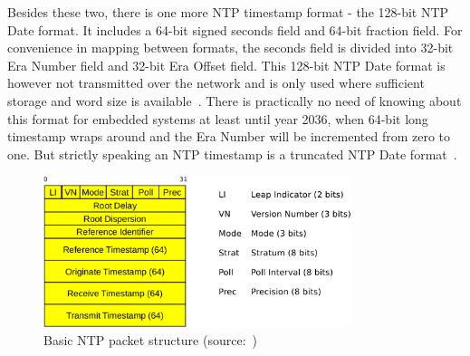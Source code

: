 Besides these two, there is one more NTP timestamp format - the 128-bit NTP Date format.
It includes a 64-bit signed seconds field and 64-bit fraction field.
For convenience in mapping between formats,
the seconds field is divided into 32-bit Era Number field
and 32-bit Era Offset field.
This 128-bit NTP Date format is however not transmitted over the network
and is only used where sufficient storage and word size is available~\cite{rfc5905}.
There is practically no need of knowing about this format for embedded systems
at least until year 2036, when 64-bit long timestamp wraps around and
the Era Number will be incremented from zero to one.
But strictly speaking an NTP timestamp is a truncated NTP Date format~\cite{rfc5905}.

\begin{figure}
	\centering
	\includegraphics[width=9cm,keepaspectratio]{fig/ntp-packet.pdf}
	\caption{Basic NTP packet structure (source:~\cite{ntp-arch})}
	\label{fig:ntp-packet}
	\bigskip
\end{figure}

